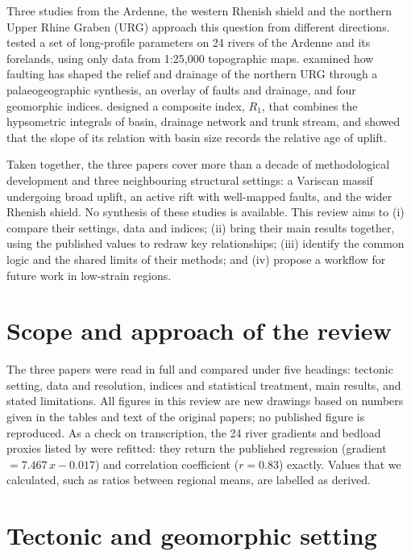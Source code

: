 \documentclass[10pt,a4paper,twocolumn]{article}
\begin{document}
Three studies from the Ardenne, the western Rhenish shield and the northern Upper Rhine Graben
(URG) approach this question from different directions. \citet{Demoulin1998} tested a set of
long-profile parameters on 24 rivers of the Ardenne and its forelands, using only data from 1:25,000 topographic maps.
\citet{PetersVanBalen2007} examined how faulting has shaped the relief and drainage of the northern URG
through a palaeogeographic synthesis, an overlay of faults and drainage, and four geomorphic indices.
\citet{Demoulin2011} designed a composite index, $R_1$, that combines the hypsometric integrals of
basin, drainage network and trunk stream, and showed that the slope of its relation with basin size
records the relative age of uplift.

Taken together, the three papers cover more than a decade of methodological development and three
neighbouring structural settings: a Variscan massif undergoing broad uplift, an active rift with
well-mapped faults, and the wider Rhenish shield. No synthesis of these studies is available. This
review aims to (i) compare their settings, data and indices; (ii) bring their main results together,
using the published values to redraw key relationships; (iii) identify the common logic and the
shared limits of their methods; and (iv) propose a workflow for future work in low-strain regions.

\section{Scope and approach of the review}

The three papers were read in full and compared under five headings: tectonic setting, data and
resolution, indices and statistical treatment, main results, and stated limitations. All figures in
this review are new drawings based on numbers given in the tables and text of the original papers;
no published figure is reproduced. As a check on transcription, the 24 river gradients and bedload
proxies listed by \citet{Demoulin1998} were refitted: they return the published regression (gradient
$=7.467\,x-0.017$) and correlation coefficient ($r=0.83$) exactly. Values that we calculated, such as
ratios between regional means, are labelled as derived.

\section{Tectonic and geomorphic setting}
\end{document}
